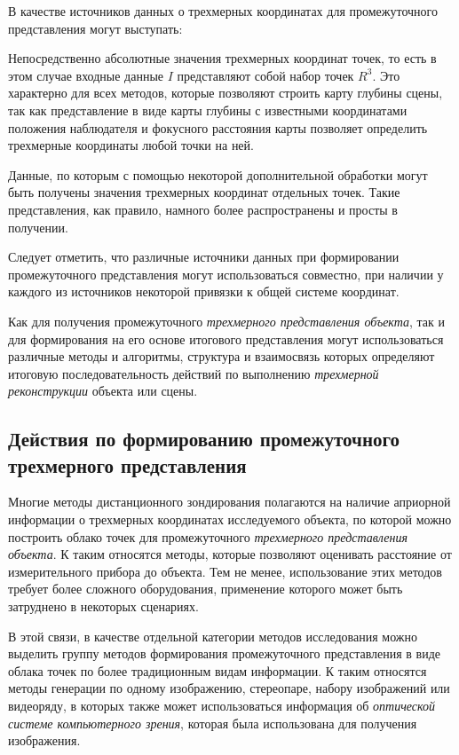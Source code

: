В качестве источников данных о трехмерных координатах для промежуточного представления могут выступать:
\begin{textitemize}
    \item Непосредственно абсолютные значения трехмерных координат точек, то есть в этом случае входные данные $I$ представляют собой набор точек ${R^3}$. Это характерно для всех методов, которые позволяют строить карту глубины сцены, так как представление в виде карты глубины с известными координатами положения наблюдателя и фокусного расстояния карты позволяет определить трехмерные координаты любой точки на ней.
    \item Данные, по которым с помощью некоторой дополнительной обработки могут быть получены значения трехмерных координат отдельных точек. Такие представления, как правило, намного более распространены и просты в получении.
\end{textitemize}

Следует отметить, что различные источники данных при формировании промежуточного представления могут использоваться совместно, при наличии у каждого из источников некоторой привязки к общей системе координат.

Как для получения промежуточного \textit{трехмерного представления объекта}, так и для формирования на его основе итогового представления могут использоваться различные методы и алгоритмы, структура и взаимосвязь которых определяют итоговую последовательность действий по выполнению \textit{трехмерной реконструкции} объекта или сцены.


\subsection{Действия по формированию промежуточного трехмерного представления}
\label{sec_3d_models_actions_interm}

Многие методы дистанционного зондирования полагаются на наличие априорной информации о трехмерных координатах исследуемого объекта, по которой можно построить облако точек для промежуточного \textit{трехмерного представления объекта}. К таким относятся методы, которые позволяют оценивать расстояние от измерительного прибора до объекта. Тем не менее, использование этих методов требует более сложного оборудования, применение которого может быть затруднено в некоторых сценариях.

В этой связи, в качестве отдельной категории методов исследования можно выделить группу методов формирования промежуточного представления в виде облака точек по более традиционным видам информации. К таким относятся методы генерации по одному изображению, стереопаре, набору изображений или видеоряду, в которых также может использоваться информация об \textit{оптической системе компьютерного зрения}, которая была использована для получения изображения.

